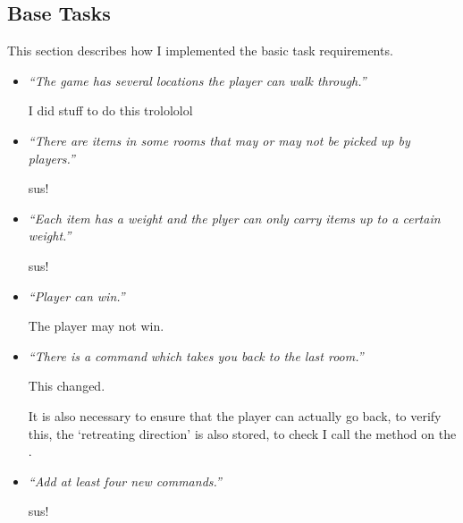 \documentclass{article}
\begin{document}
\begin{multicols}{2}

        \section{Base Tasks}

            This section describes how I implemented the basic task requirements.

            \begin{itemize}[leftmargin=*]
                \item \textit{``The game has several locations the player can walk through.''}
                
                    I did stuff to do this trolololol

                \item \textit{``There are items in some rooms that may or may not be picked up by players.''}
                
                    sus!
                
                \item \textit{``Each item has a weight and the plyer can only carry items up to a certain weight.''}
                
                    sus!
                
                \item \textit{``Player can win.''}
                
                    The player may not win.

                \item \textit{``There is a command}  \textit{which takes you back to the last room.''}
                
                    This changed.    
                
                    It is also necessary to ensure that the player can actually go back, to verify this, the `retreating direction' is also stored, to check I call the method  on the .

                \item \textit{``Add at least four new commands.''}
                
                    sus!
            \end{itemize}


\end{multicols}
\end{document}
